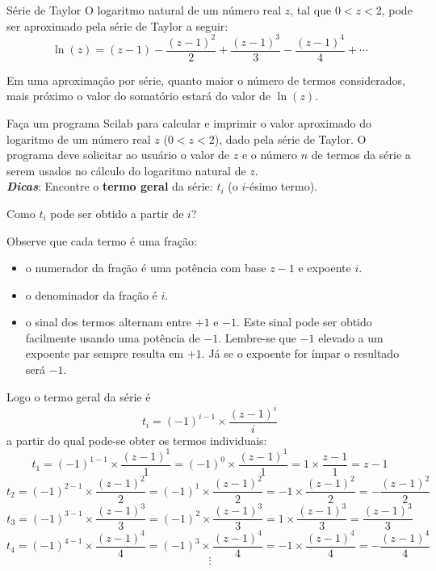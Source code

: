 \documentclass[11pt,fleqn]{practice}
\begin{document}
\begin{task}[breakable]{Série de Taylor}{}
  O logaritmo natural de um número real $z$, tal que $0 < z < 2$, pode
  ser aproximado pela série de Taylor a seguir:
  \[ \ln{(z)} = (z-1) - \frac{(z-1)^2}{2} + \frac{(z-1)^3}{3} -
  \frac{(z-1)^4}{4} + \cdots \]

  Em uma aproximação por série, quanto maior o número de termos
  considerados, mais próximo o valor do somatório estará do valor de
  $\ln{(z)}$.

  Faça um programa Scilab para calcular e imprimir o valor aproximado do
  logaritmo de um número real $z$ ($0< z< 2$), dado pela série de
  Taylor. O programa deve solicitar ao usuário o valor de $z$ e o número
  $n$ de termos da série a serem usados no cálculo do logaritmo natural
  de $z$.
  \\[1em]
  \textbf{\emph{Dicas\/}}:\newline
  Encontre o \textbf{termo geral} da série: $t_i$ (o $i$-ésimo termo).

  Como $t_i$ pode ser obtido a partir de $i$?

  Observe que cada termo é uma fração:
  \begin{itemize}
    \item o numerador da fração é uma potência com base $z-1$ e expoente
    $i$.
    \item o denominador da fração é $i$.
    \item o sinal dos termos alternam entre $+1$ e $-1$. Este sinal pode
    ser obtido facilmente usando uma potência de $-1$. Lembre-se que
    $-1$ elevado a um expoente par sempre resulta em $+1$. Já se o
    expoente for ímpar o resultado será $-1$.
  \end{itemize}
  Logo o termo geral da série é
  \[ t_i = (-1)^{i-1} \times \frac{(z-1)^i}{i} \]
  a partir do qual pode-se obter os termos individuais:
  \[ t_1 = (-1)^{1-1} \times \frac{(z-1)^1}{1} = (-1)^0 \times \frac{(z-1)^1}{1} = 1 \times \frac{z-1}{1} = z - 1 \]
  \[ t_2 = (-1)^{2-1} \times \frac{(z-1)^2}{2} = (-1)^1 \times \frac{(z-1)^2}{2} = -1 \times \frac{(z-1)^2}{2} = - \frac{(z-1)^2}{2} \]
  \[ t_3 = (-1)^{3-1} \times \frac{(z-1)^3}{3} = (-1)^2 \times \frac{(z-1)^3}{3} = 1 \times \frac{(z-1)^3}{3} = \frac{(z-1)^3}{3} \]
  \[ t_4 = (-1)^{4-1} \times \frac{(z-1)^4}{4} = (-1)^3 \times \frac{(z-1)^4}{4} = -1 \times \frac{(z-1)^4}{4} = - \frac{(z-1)^4}{4} \]
  \[ \vdots \]


\end{task}
\end{document}
